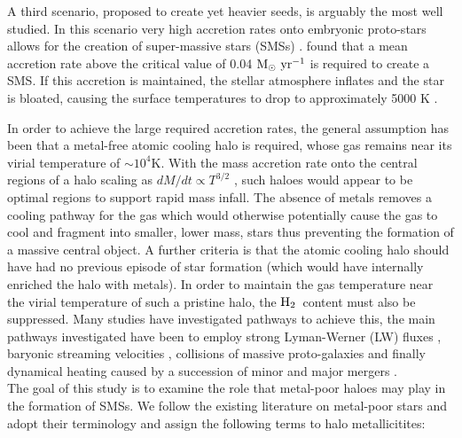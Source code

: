 \documentclass[graphics, twocolumn, usenatbib]{mn2e}
\newcommand{\msolaryr} {$\rm{M_{\odot}~yr^{-1}}~$}
\newcommand{\molH} {$\rm{H_2}$~}
\begin{document}
\indent A third scenario, proposed to create yet heavier seeds, is arguably the most well studied. In this scenario very high accretion rates onto embryonic proto-stars allows for the creation of super-massive stars (SMSs)
\citep{Shapiro_1979, Begelman_2008, Schleicher_2013, Hosokawa_2013, Inayoshi_2014, Sakurai_2016,
  Umeda_2016, Haemmerle_2017,Woods_2017, Woods_2018, Regan_2018b}. \cite{Sakurai_2016} found
that a mean accretion rate above the critical value of 0.04 \msolaryr is required to create a SMS.
If this accretion is maintained, the stellar atmosphere inflates and the star is bloated, causing the surface temperatures to drop to approximately 5000 K \citep{Hosokawa_2013, Haemmerle_2017,Woods_2017}. 

In order to achieve the large required accretion rates, the general assumption has been
that a metal-free atomic cooling halo is required, whose gas remains near its virial temperature of $\sim10^4$K.
With the mass accretion rate onto the central regions of a halo scaling as $dM/dt \propto T^{3/2}$ \citep{Shu_1977}, such haloes would appear
to be optimal regions to support rapid mass infall. The absence of metals removes a cooling pathway for
the gas which would otherwise potentially cause the gas to cool and fragment into smaller, lower
mass, stars thus preventing the formation of a massive central object. A further criteria is that the
atomic cooling halo should have had no previous episode of star formation (which would have
internally enriched the halo with metals). In order to maintain the gas temperature near the virial temperature of such a pristine halo, the \molH content
must also be suppressed. Many studies have investigated pathways to achieve this, the main pathways
investigated have been to employ strong Lyman-Werner (LW) fluxes \citep{Dijkstra_2008, Shang_2010,
  Regan_2014b, Latif_2014b, Agarwal_2015a, Latif_2015, Regan_2016a, Regan_2017, Regan_2018a},
baryonic streaming velocities
\citep{Tseliakhovich_2010, Tanaka_2014, Hirano_2017, Schauer_2017}, collisions of massive
proto-galaxies \citep{Mayer_2010, Mayer_2014, Inayoshi_2015} and finally dynamical heating caused
by a succession of minor and major mergers \citep{Yoshida_2003a, Fernandez_2014, Wise_2019}. \\
\indent The goal of this study is to examine the role that metal-poor haloes may play in the
formation of SMSs. We follow the existing literature on metal-poor stars \citep[e.g.][]{Frebel_2015}
and adopt their terminology and assign the following terms to halo metallicitites:
\end{document}
